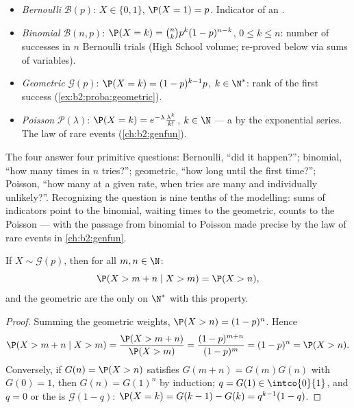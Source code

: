 \begin{example}\label{ex:b2:randomvar:laws}
\leavevmode
\begin{itemize}
\item \emph{Bernoulli} $\mathcal{B}(p)$: $X \in \{0, 1\}$, $\P(X =
1) = p$. Indicator of an .
\item \emph{Binomial} $\mathcal{B}(n, p)$: $\P(X = k) =
\binom nk p^k(1-p)^{n-k}$, $0 \leq k \leq n$: number of successes
in $n$  Bernoulli trials (High School volume; re-proved
below via sums of  variables).
\item \emph{Geometric} $\mathcal{G}(p)$: $\P(X = k) =
(1-p)^{k-1}p$, $k \in \N^*$: rank of the first success
(\cref{ex:b2:proba:geometric}).
\item \emph{Poisson} $\mathcal{P}(\lambda)$: $\P(X = k) =
e^{-\lambda}\frac{\lambda^k}{k!}$, $k \in \N$ --- a  by the exponential series. The law of rare events
(\cref{ch:b2:genfun}).
\end{itemize}
\end{example}

\begin{remark}
The four  answer four primitive questions: Bernoulli,
``did it happen?''; binomial, ``how many times in $n$
tries?''; geometric, ``how long until the first time?'';
Poisson, ``how many  at a given rate, when tries are
many and individually unlikely?''. Recognizing the question
is nine tenths of the modelling: sums of indicators point to
the binomial, waiting times to the geometric, 
counts to the Poisson --- with the passage from binomial to
Poisson made precise by the law of rare events in
\cref{ch:b2:genfun}.
\end{remark}

\begin{proposition}\label{prop:b2:randomvar:memoryless}
If $X \sim \mathcal{G}(p)$, then for all $m, n \in \N$:
\[
\P(X > m + n \mid X > m) = \P(X > n) ,
\]
and the geometric  are the only  on $\N^*$ with this
property.
\end{proposition}

\begin{proof}
Summing the geometric weights, $\P(X > n) = (1-p)^n$. Hence
\[
\P(X > m + n \mid X > m)
= \frac{\P(X > m + n)}{\P(X > m)}
= \frac{(1-p)^{m+n}}{(1-p)^m} = (1-p)^n = \P(X > n).
\]
Conversely, if $G(n) = \P(X > n)$ satisfies $G(m + n) =
G(m)G(n)$ with $G(0) = 1$, then $G(n) = G(1)^n$ by induction; $q =
G(1) \in \intco{0}{1}$, and $q = 0$ or the  is
$\mathcal{G}(1 - q)$: $\P(X = k) = G(k-1) - G(k) =
q^{k-1}(1 - q)$.
\end{proof}

